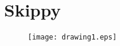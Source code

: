 \documentclass[12pt]{report}
\begin{document}

\chapter{Skippy}
\begin{figure}
\centerline{
   \texttt{[image: drawing1.eps]}}
\end{figure}

\end{document}
